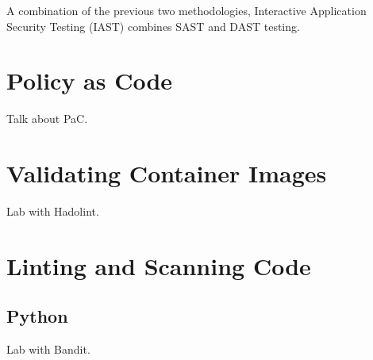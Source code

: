 \justifying
A combination of the previous two methodologies, Interactive Application Security Testing (IAST) combines
SAST and DAST testing.

\section{Policy as Code}

\justifying
Talk about PaC.

\section{Validating Container Images}

\justifying
Lab with Hadolint.

\section{Linting and Scanning Code}

\subsection{Python}

\justifying
Lab with Bandit.